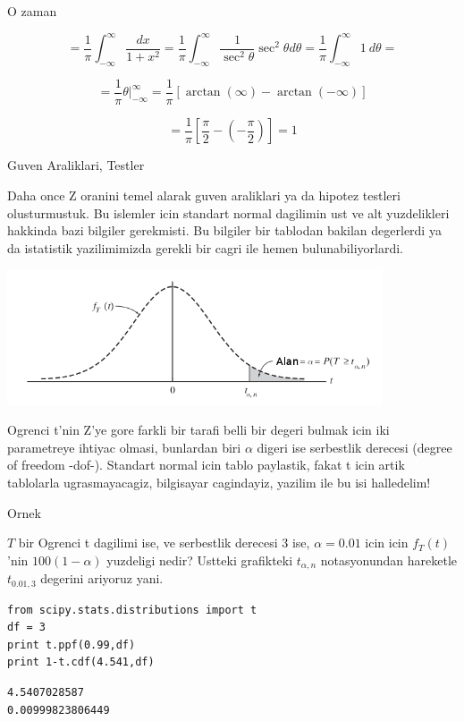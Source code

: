 \documentclass[12pt,fleqn]{article}\usepackage{../common}
\begin{document}
O zaman 

$$ =
\frac{ 1}{\pi} \int _{ -\infty}^{\infty} \frac{ dx}{1 + x^2}   =
\frac{ 1}{\pi} \int _{ -\infty}^{\infty}  \frac{ 1}{\sec^2\theta}\sec^2\theta d\theta = 
\frac{ 1}{\pi} \int _{ -\infty}^{\infty}  1 \ d\theta = 
 $$

$$ = 
\frac{ 1}{\pi} \theta | _{ -\infty}^{\infty}   = 
\frac{ 1}{\pi} [\arctan(\infty) - \arctan(-\infty)]
 $$

$$ =
\frac{ 1}{\pi} [\frac{ \pi}{2} - (-\frac{ \pi}{2}) ] = 1
 $$


Guven Araliklari, Testler

Daha once Z oranini temel alarak guven araliklari ya da hipotez testleri
olusturmustuk. Bu islemler icin standart normal dagilimin ust ve alt
yuzdelikleri hakkinda bazi bilgiler gerekmisti. Bu bilgiler bir tablodan
bakilan degerlerdi ya da istatistik yazilimimizda gerekli bir cagri ile
hemen bulunabiliyorlardi.

\includegraphics[height=4cm]{t2.png}

Ogrenci t'nin Z'ye gore farkli bir tarafi belli bir degeri bulmak icin iki
parametreye ihtiyac olmasi, bunlardan biri $\alpha$ digeri ise serbestlik
derecesi (degree of freedom -dof-). Standart normal icin tablo paylastik,
fakat t icin artik tablolarla ugrasmayacagiz, bilgisayar cagindayiz,
yazilim ile bu isi halledelim! 

Ornek

$T$ bir Ogrenci t dagilimi ise, ve serbestlik derecesi 3 ise, $\alpha=0.01$
icin icin $f_T(t)$'nin $100(1-\alpha)$ yuzdeligi nedir? Ustteki grafikteki
$t_{\alpha,n}$ notasyonundan hareketle $t_{0.01,3}$ degerini ariyoruz yani.

\begin{verbatim}
from scipy.stats.distributions import t
df = 3
print t.ppf(0.99,df)
print 1-t.cdf(4.541,df)
\end{verbatim}

\begin{verbatim}
4.5407028587
0.00999823806449
\end{verbatim}
\end{document}
